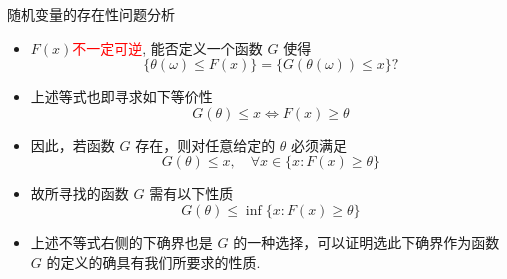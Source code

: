  \begin{frame}{随机变量的存在性问题分析}
	 \begin{itemize}[<+-|alert@+>]
	 \item $F (x)$\textcolor{red}{不一定可逆}, 能否定义一个函数 $G$ 使得
		 \[\{\theta(\omega)\le F(x)\}=\{G(\theta(\omega))\le x\}?\]
	 \item 上述等式也即寻求如下等价性
	 \[G(\theta)\leq x \Leftrightarrow F(x)\ge \theta \]
	 \item 因此，若函数 $G$ 存在，则对任意给定的 $\theta$ 必须满足
	 \[G(\theta)\leq x, \quad  \forall x\in \{x: F(x)\ge\theta\}\]
	 \item 故所寻找的函数 $G$ 需有以下性质
	 \[G(\theta)\leq \inf\{x:F(x)\geq \theta\}\]
	 \item 上述不等式右侧的下确界也是 $G$ 的一种选择，可以证明选此下确界作为函数 $G$ 的定义的确具有我们所要求的性质.%
	 \end{itemize}




 \end{frame}

